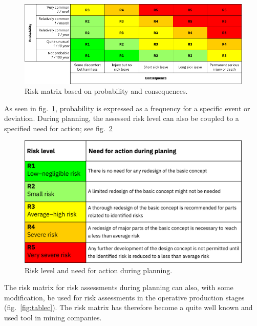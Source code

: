 \documentclass[
  12pt,
]{scrbook}
\begin{document}
\begin{figure}
\hypertarget{fig:tablea}{%
\centering
\includegraphics{./media/tab-matrix.png}
\caption{Risk matrix based on probability and consequences.}\label{fig:tablea}
}
\end{figure}

As seen in fig.~\ref{fig:tablea}, probability is expressed as a frequency for a specific event or deviation. During planning, the assessed risk level can also be coupled to a specified need for action; see fig.~\ref{fig:tableb}

\begin{figure}
\hypertarget{fig:tableb}{%
\centering
\includegraphics{./media/risk-level-planning.png}
\caption{Risk level and need for action during planning.}\label{fig:tableb}
}
\end{figure}

The risk matrix for risk assessments during planning can also, with some modification, be used for risk assessments in the operative production stages (fig.~\ref{fig:tablec}). The risk matrix has therefore become a quite well known and used tool in mining companies.
\end{document}
